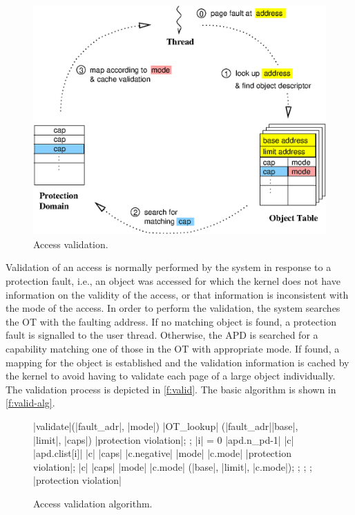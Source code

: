 \documentclass[a4paper,11pt,twoside,dvips]{report}
\begin{document}
\begin{figure}[hbt]
\begin{center}
\includegraphics[height=0.4\textheight]{validate}
\caption{\label{f:valid}Access validation.}
\end{center}
\end{figure}


Validation of an access is normally performed by the system in response
to a protection fault, i.e., an object was accessed for which the kernel
does not have information on the validity of the access, or that
information is inconsistent with the mode of the access. In order to
perform the validation, the system searches the OT with the faulting
address. If no matching object is found, a protection fault is
signalled to the user thread.  Otherwise, the APD is searched for a
capability matching one of those in the OT with appropriate mode. If
found, a mapping for the object is established and the validation
information is cached by the kernel to avoid having to validate each
page of a large object individually. The validation process is depicted
in \autoref{f:valid}. The basic algorithm is shown in
\autoref{f:valid-alg}.

\begin{figure}[htb]
\begin{center}
\begin{programbox}
\FUNCT |validate|(|fault\_adr|, |mode|) \BODY
   \IF \NOT |OT\_lookup| (|fault\_adr|\RETURNS|base|, |limit|, |caps|) \THEN
	\RAISE |protection violation|;
   \FI;
   \FOR |i| = 0 \TO |apd.n_pd-1| \DO
	    \FOREACH |c| \in |apd.clist[i]| \DO
		\IF |c| \in |caps| \AND |c.negative| \AND |mode| \supseteq |c.mode| \THEN
			\RAISE |protection violation|;
		\ELSIF |c| \in |caps| \AND |mode| \subseteq |c.mode| \THEN
			\RETURN (|base|, |limit|, |c.mode|);
		\FI;
	    \OD;
\OD;
\RAISE |protection violation| \ENDFUNCT
\end{programbox}
\end{center}
\caption{\label{f:valid-alg}Access validation algorithm.}
\end{figure}
\end{document}
